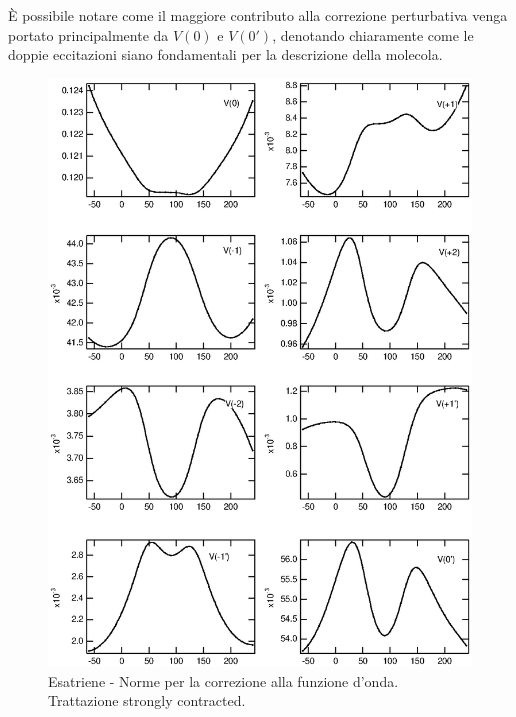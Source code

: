 \`E possibile notare come il maggiore contributo alla correzione perturbativa
venga portato principalmente da $V(0)$ e $V(0')$, denotando chiaramente come 
le doppie eccitazioni siano fondamentali per la descrizione della molecola. %

\pagebreak
\begin{figure}[ht]
\begin{center}
\includegraphics[angle=0,width=14cm,keepaspectratio]{immagini/esatriene/norme_sc.eps}
\caption{\small Esatriene - Norme per la correzione alla funzione d'onda.
Trattazione strongly contracted. }
\label{fig:esatriene_norme_sc}
\end{center}
\end{figure}
\pagebreak
